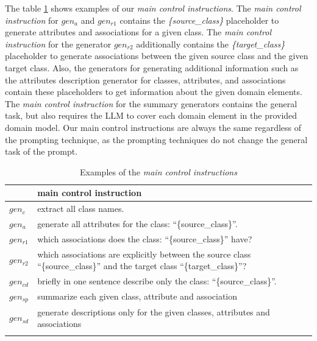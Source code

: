 The table \ref{tab:main_control_instructions} shows examples of our \emph{main control instructions}. The \emph{main control instruction} for $gen_a$ and $gen_{r1}$ contains the \textit{\{source\_class\}} placeholder to generate attributes and associations for a given class. The \emph{main control instruction} for the generator $gen_{r2}$ additionally contains the \textit{\{target\_class\}} placeholder to generate associations between the given source class and the given target class. Also, the generators for generating additional information such as the attributes description generator for classes, attributes, and associations contain these placeholders to get information about the given domain elements. The \emph{main control instruction} for the summary generators contains the general task, but also requires the LLM to cover each domain element in the provided domain model.
Our main control instructions are always the same regardless of the prompting technique, as the prompting techniques do not change the general task of the prompt.


\begin{table}[!h]
    \scriptsize
    \centering
    \setlength{\tabcolsep}{0.5em}
\begin{tabular}{@{}l>{\raggedright\arraybackslash}p{}>{\raggedright\arraybackslash}p{}@{}}
         & main control instruction \\
    \toprule
    \addlinespace
    
$gen_c$ & extract all class names. \\
\addlinespace

$gen_a$ & generate all attributes for the class: ``\{source\_class\}''. \\
\addlinespace

$gen_{r1}$ & which associations does the class: ``\{source\_class\}'' have? \\
\addlinespace

$gen_{r2}$ & which associations are explicitly between the source class ``\{source\_class\}'' and the target class ``\{target\_class\}''? \\
\addlinespace

$gen_{cd}$ & briefly in one sentence describe only the class: ``\{source\_class\}''. \\
\addlinespace

$gen_{sp}$ & summarize each given class, attribute and association \\
\addlinespace

$gen_{sd}$ & generate descriptions only for the given classes, attributes and associations \\
\addlinespace

	\bottomrule
	\addlinespace
	\end{tabular}
	\caption{Examples of the \emph{main control instructions}}
	\label{tab:main_control_instructions}
\end{table}


